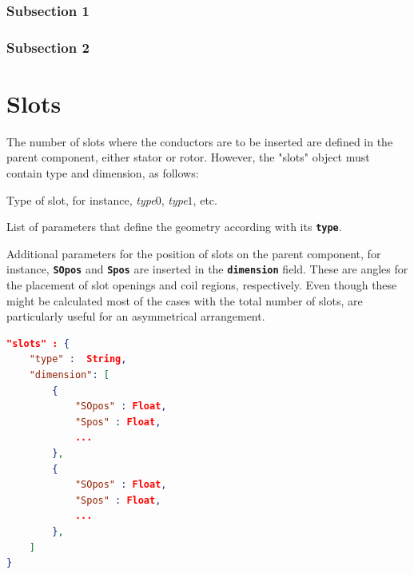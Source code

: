 \documentclass{tufte-book} %
\begin{document}
\subsection{Subsection 1}

\lipsum[9-10]

\subsection{Subsection 2}

\lipsum[11-12]


\chapter{Slots}
\label{ch:slots}

The number of slots where the conductors are to be inserted are defined in the parent component, either stator or rotor. However, the "slots" object must contain type and dimension, as follows:
\begin{description}[leftmargin=4cm, style=nextline]
\item[\normalfont{\ttfamily{\textbf{type}}: \textit{String}}] Type of slot, for instance, \textit{type$0$}, \textit{type$1$}, etc.
\item[\normalfont{\ttfamily{\textbf{dimension}}: \textit{Array}}] List of parameters that define the geometry according with its \texttt{\textbf{type}}.
\end{description}

Additional parameters for the position of slots on the parent component, for instance, \texttt{\textbf{SOpos}} and \texttt{\textbf{Spos}} are inserted in the \texttt{\textbf{dimension}} field. These are angles for the placement of slot openings and coil regions, respectively. Even though these might be calculated most of the cases with the total number of slots, are particularly useful for an asymmetrical arrangement. 

\begin{lstlisting}[language=json]
"slots" : {
	"type" :  String,
	"dimension": [
		{
			"SOpos" : Float,
			"Spos" : Float,
			...
		},
		{
			"SOpos" : Float,
			"Spos" : Float,
			...
		},
	]
}
\end{lstlisting}
\end{document}
